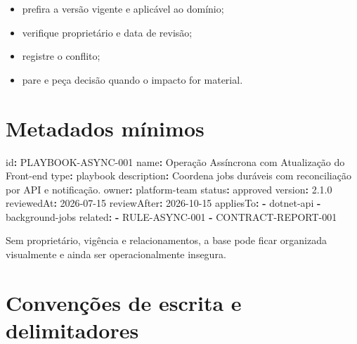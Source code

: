 \documentclass[
  10pt,
  a4paper,
  oneside]{book}
\newenvironment{Shaded}{}{}
\newcommand{\AttributeTok}[1]{\textcolor[rgb]{0.49,0.56,0.16}{#1}}
\newcommand{\FloatTok}[1]{\textcolor[rgb]{0.25,0.63,0.44}{#1}}
\newcommand{\FunctionTok}[1]{\textcolor[rgb]{0.02,0.16,0.49}{#1}}
\newcommand{\KeywordTok}[1]{\textcolor[rgb]{0.00,0.44,0.13}{\textbf{#1}}}
\providecommand{\tightlist}{%
  \setlength{\itemsep}{0pt}\setlength{\parskip}{0pt}}
\begin{document}
\begin{itemize}
\tightlist
\item
  prefira a versão vigente e aplicável ao domínio;
\item
  verifique proprietário e data de revisão;
\item
  registre o conflito;
\item
  pare e peça decisão quando o impacto for material.
\end{itemize}

\hypertarget{metadados-muxednimos}{%
\section{Metadados mínimos}\label{metadados-muxednimos}}

\begin{Shaded}
\begin{Highlighting}[]
\FunctionTok{id}\KeywordTok{:}\AttributeTok{ PLAYBOOK{-}ASYNC{-}001}
\FunctionTok{name}\KeywordTok{:}\AttributeTok{ Operação Assíncrona com Atualização do Front{-}end}
\FunctionTok{type}\KeywordTok{:}\AttributeTok{ playbook}
\FunctionTok{description}\KeywordTok{:}\AttributeTok{ Coordena jobs duráveis com reconciliação por API e notificação.}
\FunctionTok{owner}\KeywordTok{:}\AttributeTok{ platform{-}team}
\FunctionTok{status}\KeywordTok{:}\AttributeTok{ approved}
\FunctionTok{version}\KeywordTok{:}\AttributeTok{ }\FloatTok{2.1.0}
\FunctionTok{reviewedAt}\KeywordTok{:}\AttributeTok{ 2026{-}07{-}15}
\FunctionTok{reviewAfter}\KeywordTok{:}\AttributeTok{ 2026{-}10{-}15}
\FunctionTok{appliesTo}\KeywordTok{:}
\AttributeTok{  }\KeywordTok{{-}}\AttributeTok{ dotnet{-}api}
\AttributeTok{  }\KeywordTok{{-}}\AttributeTok{ background{-}jobs}
\FunctionTok{related}\KeywordTok{:}
\AttributeTok{  }\KeywordTok{{-}}\AttributeTok{ RULE{-}ASYNC{-}001}
\AttributeTok{  }\KeywordTok{{-}}\AttributeTok{ CONTRACT{-}REPORT{-}001}
\end{Highlighting}
\end{Shaded}

Sem proprietário, vigência e relacionamentos, a base pode ficar
organizada visualmente e ainda ser operacionalmente insegura.

\hypertarget{convenuxe7uxf5es-de-escrita-e-delimitadores}{%
\section{Convenções de escrita e
delimitadores}\label{convenuxe7uxf5es-de-escrita-e-delimitadores}}
\end{document}
